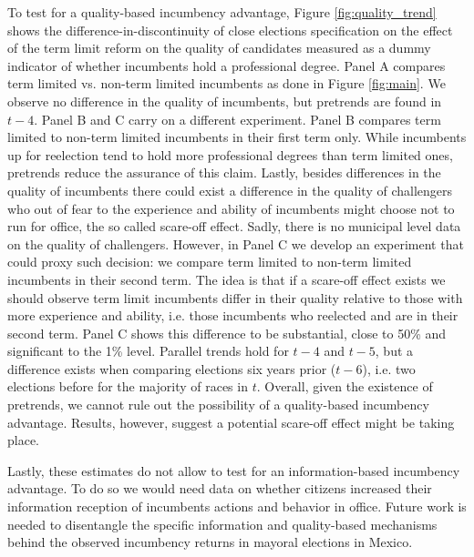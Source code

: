 \documentclass[12pt]{amsart}
\makeatletter
\def\section{\@startsection{section}{1}
	\z@{1.0\linespacing\@plus\linespacing}{.5\linespacing}{\Large}}
\numberwithin{equation}{section}
\theoremstyle{definition}
\theoremstyle{definition}
\theoremstyle{definition}
\makeatother
\begin{document}
To test for a quality-based incumbency advantage, Figure \ref{fig:quality_trend} shows the difference-in-discontinuity of close elections specification on the effect of the term limit reform on the quality of candidates measured as a dummy indicator of whether incumbents hold a professional degree. Panel A compares term limited vs. non-term limited incumbents as done in Figure \ref{fig:main}. We observe no difference in the quality of incumbents, but pretrends are found in $t-4$. Panel B and C carry on a different experiment. Panel B compares term limited to non-term limited incumbents in their first term only. While incumbents up for reelection tend to hold more professional degrees than term limited ones, pretrends reduce the assurance of this claim. Lastly, besides differences in the quality of incumbents there could exist a difference in the quality of challengers who out of fear to the experience and ability of incumbents might choose not to run for office, the so called scare-off effect. Sadly, there is no municipal level data on the quality of challengers. However, in Panel C we develop an experiment that could proxy such decision: we compare term limited to non-term limited incumbents in their second term. The idea is that if a scare-off effect exists we should observe term limit incumbents differ in their quality relative to those with more experience and ability, i.e. those incumbents who reelected and are in their second term. Panel C shows this difference to be substantial, close to 50\% and significant to the 1\% level. Parallel trends hold for $t-4$ and $t-5$, but a difference exists when comparing elections six years prior ($t-6$), i.e. two elections before for the majority of races in $t$. Overall, given the existence of pretrends, we cannot rule out the possibility of a quality-based incumbency advantage. Results, however, suggest a potential scare-off effect might be taking place. 

Lastly, these estimates do not allow to test for an information-based incumbency advantage. To do so we would need data on whether citizens increased their information reception of incumbents actions and behavior in office. Future work is needed to disentangle the specific information and quality-based mechanisms behind the observed incumbency returns in mayoral elections in Mexico. 

  

\section{Conclusion} 
\end{document}
